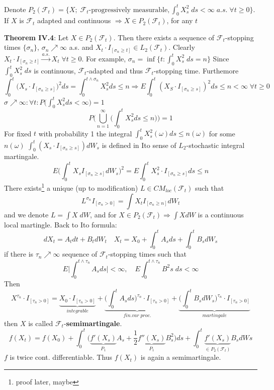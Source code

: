 \documentclass[english]{article}
\newcommand{\ub}{\underbrace}
\newcommand{\note}[1]{\noindent\textbf{#1}}
\newcommand{\F}{\mathcal F}
\newcommand{\as}[1]{\stackrel {a.s.}{#1}}
\begin{document}
Denote $P_2(\F_t) = \{X; \; \F_t\text{-progressively measurable}, \int^t_0 X^2_s \; ds < \infty\; a.s. \; \forall t \geq 0\}$. If $X$ is $\F_t$ adapted and continuous $\Rightarrow X\in P_2(\F_t)$, for any $t$ \newline

\note{Theorem IV.4}: Let $X \in P_2(\F_t)$. Then there exists a sequence of $\F_t$-stopping times $\{\sigma_n\}$, $\sigma_n \nearrow \infty$ a.s. and $X_t \cdot I_{[\sigma_n \geq t ]} \in L_2(\F_t)$. \newline
Clearly $X_t\cdot I_{[\sigma_n \geq t ]} \as\to X_t \; \forall t\geq 0$. \newline
For example, $\sigma_n = \inf \{t: \int^t_0 X^2_s \; ds = n\}$
Since $\int^t_0 X^2_s \; ds$ is continuous, $\F_t$-adapted and thus $\F_t$-stopping time. Furthemore
$$\int^t_0 \Big(X_s \cdot I_{[\sigma_n \geq s]}\Big)^2 ds = \int^{t\wedge \sigma_n}_0 X^2_s ds \leq n \Rightarrow E\int^t_0 (X_S \cdot I_{[\sigma_n \geq s]})^2 ds \leq n < \infty \; \forall t \geq 0$$
$\sigma \nearrow \infty: \forall t: P\Big(\int^t_0 X^2_s ds < \infty \Big) =1$
$$P\Big(\bigcup^\infty_{n=1} \Big(\int^t_0 X^2_s ds \leq n \Big) \Big) = 1$$
For fixed $t$ with probability 1 the integral $\int^t_0 X^2_s(\omega) ds \leq n(\omega)$ for some $n(\omega)$ \newline
$\int^t_0 (X_s \cdot I_{[\sigma_n \geq s]}) dW_s$ is defined in Ito sense of $L_2$-stochastic integral martingale. \newline
$$E\Big(\int^t_0 X_s I_{[\sigma_n \geq s]} dW_s)^2 = E\int^t_0 X^2_s \cdot I_{[\sigma_n \geq s]} ds \leq n$$
There exists\footnote{proof later, maybe} a unique (up to modification) $L\in CM_{loc}(\F_t)$ such that 
$$L^{\sigma_n} I_{[\sigma_n >0]} = \int X_t I_{[\sigma_n \geq n]} dW_t$$
and we denote $L = \int X \; dW$, and for $X\in P_2(\F_t) \Rightarrow \int X dW$ is a continuous local martingle. \newline
Back to Ito formula:
$$dX_t = A_t dt + B_t dW_t \quad X_t = X_0 + \int^t_0 A_s ds + \int^t_0 B_s dW_s$$
if there is $\tau_n\nearrow \infty$ sequence of $\F_t$-stopping times such that 
$$E\Big|\int^{t\wedge \tau_n}_0 A_s ds \Big| < \infty, \quad E\int^{t\wedge \tau_n}_0 B^2s \;ds < \infty$$
Then $$X^{\tau_n} \cdot I_{[\tau_n > 0]} = \ub{X_0 \cdot I_{[\tau_n>0]}}_{integrable} + \ub{\Big(\int^t_0 A_s ds \Big)^{\tau_n} \cdot I_{[\tau_n > 0]}}_{fin.var \; proc.} + \ub{\Big(\int^t_0 B_s dW_s\Big)^{\tau_n} \cdot I_{[\tau_n > 0]}}_{martingale}$$
then $X$ is called $\F_t$-\textbf{semimartingale}. \newline
$$f(X_t) = f(X_0) + \int^t_0 \Big(\ub{f'(X_s)}_{P_1} A_s + \frac 12 \ub{f''(X_s)}_{P_1}B^2_s) ds + \int^t_0 \ub{f'(X_s)}_{\in P_2(\F_t)} B_s dWs$$
$f$ is twice cont. differentiable. Thus $f(X_t)$ is again a semimartingale.\newline
\end{document}
